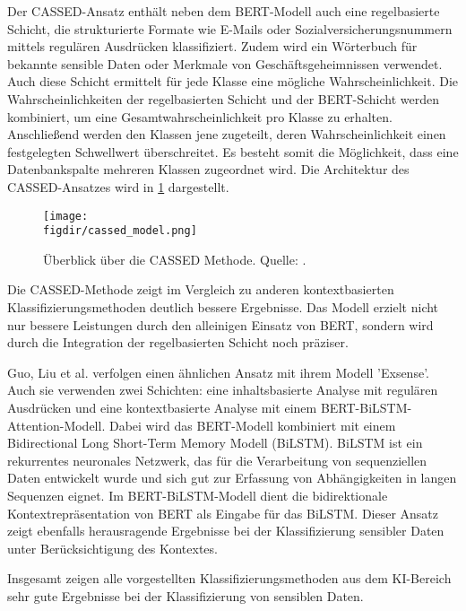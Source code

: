 Der CASSED-Ansatz enthält neben dem BERT-Modell auch eine regelbasierte Schicht, die strukturierte Formate wie E-Mails oder Sozialversicherungsnummern mittels regulären Ausdrücken klassifiziert. Zudem wird ein Wörterbuch für bekannte sensible Daten oder Merkmale von Geschäftsgeheimnissen verwendet. Auch diese Schicht ermittelt für jede Klasse eine mögliche Wahrscheinlichkeit. Die Wahrscheinlichkeiten der regelbasierten Schicht und der BERT-Schicht werden kombiniert, um eine Gesamtwahrscheinlichkeit pro Klasse zu erhalten. Anschließend werden den Klassen jene zugeteilt, deren Wahrscheinlichkeit einen festgelegten Schwellwert überschreitet. Es besteht somit die Möglichkeit, dass eine Datenbankspalte mehreren Klassen zugeordnet wird. Die Architektur des CASSED-Ansatzes wird in \ref{f:cassed} dargestellt.

\begin{figure}[htbp]
    \centering
    \texttt{[image: \\figdir/cassed\_model.png]}
    \caption{Überblick über die CASSED Methode. Quelle: \cite{Kuzina.2023}.}
    \label{f:cassed}
\end{figure}

Die CASSED-Methode zeigt im Vergleich zu anderen kontextbasierten Klassifizierungsmethoden deutlich bessere Ergebnisse. Das Modell erzielt nicht nur bessere Leistungen durch den alleinigen Einsatz von BERT, sondern wird durch die Integration der regelbasierten Schicht noch präziser.

Guo, Liu et al. \cite{Guo.2021} verfolgen einen ähnlichen Ansatz mit ihrem Modell 'Exsense'. Auch sie verwenden zwei Schichten: eine inhaltsbasierte Analyse mit regulären Ausdrücken und eine kontextbasierte Analyse mit einem BERT-BiLSTM-Attention-Modell. Dabei wird das BERT-Modell kombiniert mit einem Bidirectional Long Short-Term Memory Modell (BiLSTM). BiLSTM ist ein rekurrentes neuronales Netzwerk, das für die Verarbeitung von sequenziellen Daten entwickelt wurde und sich gut zur Erfassung von Abhängigkeiten in langen Sequenzen eignet. Im BERT-BiLSTM-Modell dient die bidirektionale Kontextrepräsentation von BERT als Eingabe für das BiLSTM. Dieser Ansatz zeigt ebenfalls herausragende Ergebnisse bei der Klassifizierung sensibler Daten unter Berücksichtigung des Kontextes.

Insgesamt zeigen alle vorgestellten Klassifizierungsmethoden aus dem KI-Bereich sehr gute Ergebnisse bei der Klassifizierung von sensiblen Daten.


